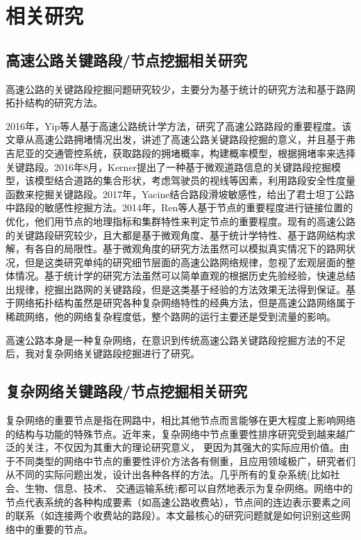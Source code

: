 
\chapter{相关研究}

\section{高速公路关键路段/节点挖掘相关研究}
	高速公路的关键路段挖掘问题研究较少，主要分为基于统计的研究方法和基于路网拓扑结构的研究方法。

	2016年，Yip等人基于高速公路统计学方法\parencite{YipTongji}，研究了高速公路路段的重要程度。该文章从高速公路拥堵情况出发，讲述了高速公路关键路段挖掘的意义，并且基于弗吉尼亚的交通管控系统，获取路段的拥堵概率，构建概率模型，根据拥堵率来选择关键路段。2016年8月，Kerner提出了一种基于微观道路信息的关键路段挖掘模型\parencite{Kerner2015The}，该模型结合道路的集合形状，考虑驾驶员的视线等因素，利用路段安全性度量函数来挖掘关键路段。2017年，Yacine结合路段滑坡敏感性，给出了君士坦丁公路中路段的敏感性挖掘方法\parencite{Yacine2017Landslide}。2014年，Ren等人基于节点的重要程度进行链接位置的优化，他们用节点的地理指标和集群特性来判定节点的重要程度。现有的高速公路的关键路段研究较少，且大都是基于微观角度、基于统计学特性、基于路网结构求解，有各自的局限性。基于微观角度的研究方法虽然可以模拟真实情况下的路网状况，但是这类研究单纯的研究细节层面的高速公路网络规律，忽视了宏观层面的整体情况。基于统计学的研究方法虽然可以简单直观的根据历史先验经验，快速总结出规律，挖掘出路网的关键路段，但是这类基于经验的方法效果无法得到保证。基于网络拓扑结构虽然是研究各种复杂网络特性的经典方法，但是高速公路网络属于稀疏网络，他的网络复杂程度低，整个路网的运行主要还是受到流量的影响。

	高速公路本身是一种复杂网络，在意识到传统高速公路关键路段挖掘方法的不足后，我对复杂网络关键路段挖掘进行了研究。

\section{复杂网络关键路段/节点挖掘相关研究}
	复杂网络的重要节点是指在网路中，相比其他节点而言能够在更大程度上影响网络的结构与功能的特殊节点。近年来，复杂网络中节点重要性排序研究受到越来越广泛的关注，不仅因为其重大的理论研究意义， 更因为其强大的实际应用价值。由于不同类型的网络中节点的重要性评价方法各有侧重，且应用领域极广，研究者们从不同的实际问题出发，设计出各种各样的方法。几乎所有的复杂系统(比如社会、生物、信息、技术、 交通运输系统)都可以自然地表示为复杂网络。网络中的节点代表系统的各种构成要素（如高速公路收费站），节点间的连边表示要素之间的联系（如连接两个收费站的路段）。本文最核心的研究问题就是如何识别这些网络中的重要的节点。 

